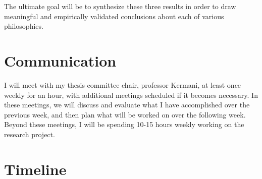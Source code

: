 \documentclass{article}
\begin{document}
    The ultimate goal will be to synthesize these three results in order to draw meaningful and empirically validated conclusions about each of various philosophies.
    

\section{Communication}

    I will meet with my thesis committee chair, professor Kermani, at least once weekly for an hour, with additional meetings scheduled if it becomes necessary. 
    In these meetings, we will discuss and evaluate what I have accomplished over the previous week, and then plan what will be worked on over the following week. 
    Beyond these meetings, I will be spending 10-15 hours weekly working on the research project. %
    
\section{Timeline}

\end{document}
